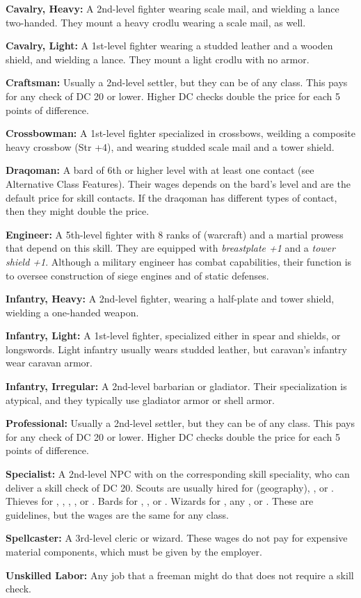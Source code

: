 \textbf{Cavalry, Heavy:} A 2nd-level fighter wearing scale mail, and wielding a lance two-handed. They mount a heavy crodlu wearing a scale mail, as well.

\textbf{Cavalry, Light:} A 1st-level fighter wearing a studded leather and a wooden shield, and wielding a lance. They mount a light crodlu with no armor.

\textbf{Craftsman:} Usually a 2nd-level settler, but they can be of any class. This pays for any  check of DC 20 or lower. Higher DC checks double the price for each 5 points of difference. 

\textbf{Crossbowman:} A 1st-level fighter specialized in crossbows, weilding a composite heavy crossbow (Str +4), and wearing studded scale mail and a tower shield.

\textbf{Draqoman:} A bard of 6th or higher level with at least one contact (see Alternative Class Features). Their wages depends on the bard's level and are the default price for skill contacts. If the draqoman has different types of contact, then they might double the price.

\textbf{Engineer:} A 5th-level fighter with 8 ranks of  (warcraft) and a martial prowess that depend on this skill. They are equipped with \emph{breastplate +1} and a \emph{tower shield +1}. Although a military engineer has combat capabilities, their function is to oversee construction of siege engines and of static defenses.

\textbf{Infantry, Heavy:} A 2nd-level fighter, wearing a half-plate and tower shield, wielding a one-handed weapon. 

\textbf{Infantry, Light:} A 1st-level fighter, specialized either in spear and shields, or longswords. Light infantry usually wears studded leather, but caravan's infantry wear caravan armor.

\textbf{Infantry, Irregular:} A 2nd-level barbarian or gladiator. Their specialization is atypical, and they typically use gladiator armor or shell armor.

\textbf{Professional:} Usually a 2nd-level settler, but they can be of any class. This pays for any  check of DC 20 or lower. Higher DC checks double the price for each 5 points of difference.

\textbf{Specialist:} A 2nd-level NPC with  on the corresponding skill speciality, who can deliver a skill check of DC 20. Scouts are usually hired for  (geography), , or . Thieves for , , , , or . Bards for , , or . Wizards for , any , or . These are guidelines, but the wages are the same for any class.

\textbf{Spellcaster:} A 3rd-level cleric or wizard. These wages do not pay for expensive material components, which must be given by the employer.

\textbf{Unskilled Labor:} Any job that a freeman might do that does not require a skill check.